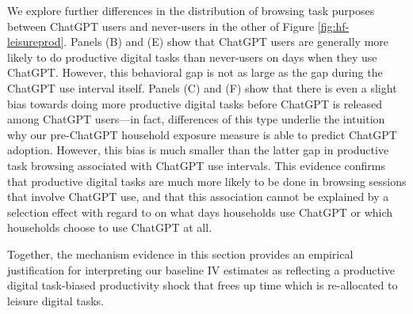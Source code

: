 \documentclass[12pt]{article}
\begin{document}
We explore further differences in the distribution of browsing task purposes between ChatGPT users and never-users in the other of Figure \ref{fig:hf-leisureprod}. Panels (B) and (E) show that ChatGPT users are generally more likely to do productive digital tasks than never-users on days when they use ChatGPT. However, this behavioral gap is not as large as the gap during the ChatGPT use interval itself. Panels (C) and (F) show that there is even a slight bias towards doing more productive digital tasks before ChatGPT is released among ChatGPT users---in fact, differences of this type underlie the intuition why our pre-ChatGPT household exposure measure is able to predict ChatGPT adoption. However, this bias is much smaller than the latter gap in productive task browsing associated with ChatGPT use intervals. This evidence  confirms that productive digital tasks are much more likely to be done in browsing sessions that involve ChatGPT use, and that this association cannot be explained by a selection effect with regard to on what days households use ChatGPT or which households choose to use ChatGPT at all.

Together, the mechanism evidence in this section provides an empirical justification for interpreting our baseline IV estimates as reflecting a productive digital task-biased productivity shock that frees up time which is re-allocated to leisure digital tasks.

\end{document}
